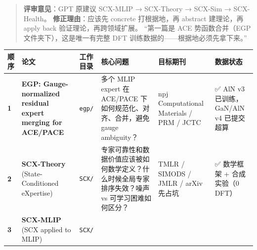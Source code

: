 \documentclass[
  12pt,
]{ctexart}
\begin{document}
\begin{quote}
\textbf{评审意见}：GPT 原建议 SCX-MLIP → SCX-Theory → SCX-Sim →
SCX-Health。 \textbf{修正理由}：应该先 concrete 打根据地，再 abstract
建理论，再 apply back 验证理论，再跨领域扩展。 ``第一篇是 ACE
势函数合并（EGP 文件夹下），这是唯一有完整 DFT
训练数据的------根据地必须先拿下来。''
\end{quote}

\begin{longtable}[]{@{}
  >{\raggedright\arraybackslash}p{}
  >{\raggedright\arraybackslash}p{}
  >{\raggedright\arraybackslash}p{}
  >{\raggedright\arraybackslash}p{}
  >{\raggedright\arraybackslash}p{}
  >{\raggedright\arraybackslash}p{}@{}}
\toprule\noalign{}
\begin{minipage}[b]{\linewidth}\raggedright
顺序
\end{minipage} & \begin{minipage}[b]{\linewidth}\raggedright
论文
\end{minipage} & \begin{minipage}[b]{\linewidth}\raggedright
工作目录
\end{minipage} & \begin{minipage}[b]{\linewidth}\raggedright
核心问题
\end{minipage} & \begin{minipage}[b]{\linewidth}\raggedright
目标期刊
\end{minipage} & \begin{minipage}[b]{\linewidth}\raggedright
数据状态
\end{minipage} \\
\midrule\noalign{}
\endhead
\bottomrule\noalign{}
\endlastfoot
\textbf{1} & \textbf{EGP: Gauge-normalized residual expert merging for
ACE/PACE} & \texttt{egp/} & 多个 MLIP expert 在 ACE/PACE
下如何规范化、对齐、合并，避免 gauge ambiguity？ & npj Computational
Materials / PRM / JCTC & ✅ AlN v3 已训练，GaN/AlN v4 已提交超算 \\
\textbf{2} & \textbf{SCX-Theory} (State-Conditioned eXpertise) &
\texttt{SCX/} &
专家可靠性和数据价值应该被如何数学定义？什么时候全局专家排序失效？噪声
vs 可学习困难如何区分？ & TMLR / SIMODS / JMLR / arXiv 先占坑 & ✅
数学框架 + 合成实验（0 DFT） \\
\textbf{3} & \textbf{SCX-MLIP} (SCX applied to MLIP) & \texttt{SCX/} &

\end{longtable}
\end{document}
